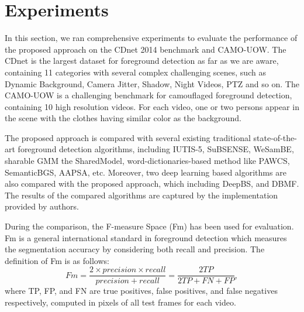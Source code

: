 \documentclass[journal]{IEEEtran}
\begin{document}
\section{Experiments}
\label{sec5}
In this section, we ran comprehensive experiments to evaluate the performance of the proposed approach on the CDnet 2014 benchmark\cite{CDN2014} and CAMO-UOW\cite{CAMO}.
%
The CDnet is the largest dataset for foreground detection as far as we are aware, containing 11 categories with several complex challenging scenes, such as Dynamic Background, Camera Jitter, Shadow, Night Videos, PTZ and so on. 
The CAMO-UOW is a challenging benchmark for camouflaged foreground detection, containing 10 high resolution videos. 
For each video, one or two persons appear in the scene with the clothes having similar color as the background.

The proposed approach is compared with several existing traditional state-of-the-art foreground detection algorithms, including IUTIS-5\cite{Bianco2017TEC}, SuBSENSE\cite{St-Charles2015SuBSENSE}, WeSamBE\cite{Jiang2017WeSamBE}, sharable GMM the SharedModel\cite{Chen2015SharedModel}, word-dictionaries-based method like PAWCS\cite{Charles2015PAWCS}, SemanticBGS\cite{Braham2017Semantic}, AAPSA\cite{RAMIREZALONSO2016990}, etc. 
Moreover, two deep learning based algorithms are also compared with the proposed approach, which including DeepBS\cite{Babaee2017deep}, and DBMF\cite{Yang2018DBMF}. 
The results of the compared algorithms are captured by the implementation provided by authors.

During the comparison, the F-measure Space (Fm) has been used for evaluation. 
Fm is a general international standard in foreground detection which measures the segmentation accuracy by considering both recall and precision. 
The definition of Fm is as follows:
\begin{equation}
Fm= \frac{2\times precision \times recall}{precision + recall} = \frac{2TP}{2TP+FN+FP},
\end{equation}
% 
% 
%
where TP, FP, and FN are true positives, false positives, and false negatives respectively, computed in pixels of all test frames for each video. 
\end{document}
